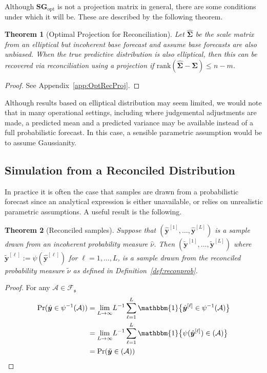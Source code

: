 \documentclass[a4paper,12pt]{article}
\newtheorem{theo}{Theorem}[section]
\theoremstyle{definition}
\begin{document}
Although $\bm{S}\bm{G}_{\text{opt}}$ is not a projection matrix in general, there are some conditions under which it will be. These are described by the following theorem.
\begin{theo}[Optimal Projection for Reconciliation]\label{theo:OptRecProj}
	Let $\hat{\bm{\Sigma}}$ be the scale matrix from an elliptical but incoherent base forecast and assume base forecasts are also unbiased. When the true predictive distribution is also elliptical, then this can be recovered via reconciliation using a projection if $\textrm{rank}(\hat{\bm{\Sigma}}-\bm{\Sigma})\leq n-m$.
\end{theo}
\begin{proof}
	See Appendix~\ref{app:OptRecProj}.
\end{proof}

{\color{red} Although results based on elliptical distribution may seem limited, we would note that in many operational settings, including where judgemental adjustments are made, a predicted mean and a predicted variance may be available instead of a full probabilistic forecast. In this case, a sensible parametric assumption would be to assume Gaussianity.}

\subsection{Simulation from a Reconciled Distribution}\label{sec:SampleSolution}

In practice it is often the case that samples are drawn from a probabilistic forecast since an analytical expression is either unavailable, or relies on unrealistic parametric assumptions. A useful result is the following.
\begin{theo}[Reconciled samples]\label{theo:recsamples}
	Suppose that $\left(\hat{\bm{y}}^{[1]},\ldots,\hat{\bm{y}}^{[L]}\right)$ is a sample drawn from an incoherent probability measure $\hat{\nu}$. Then $\left(\tilde{\bm{y}}^{[1]},\ldots,\tilde{\bm{y}}^{[L]}\right)$ where $\tilde{\bm{y}}^{[\ell]}:=\psi(\hat{\bm{y}}^{[\ell]})$ for $\ell=1,\ldots,L$, is a sample drawn from the reconciled probability measure $\tilde{\nu}$ as defined in Definition~\ref{def:reconprob}.
\end{theo}
\begin{proof}
	For any $\mathcal{A}\in\mathscr{F}_{\mathfrak{s}}$
	\begin{align}
	\mbox{Pr}(\hat{\bm{y}}\in\psi^{-1}(\mathcal{A}))&=\underset{L\rightarrow\infty}{\lim}L^{-1}\sum\limits_{\ell=1}^L\mathbbm{1}\big\{\hat{\bm{y}}^{[\ell]}\in\psi^{-1}(\mathcal{A})\big\}\nonumber\\
	&=\underset{L\rightarrow\infty}{\lim}L^{-1}\sum\limits_{\ell=1}^L\mathbbm{1}\big\{\psi(\hat{\bm{y}}^{[\ell]})\in(\mathcal{A})\big\}\nonumber\\
	&=\mbox{Pr}(\tilde{\bm{y}}\in(\mathcal{A}))\nonumber
	\end{align}
\end{proof}
\end{document}
